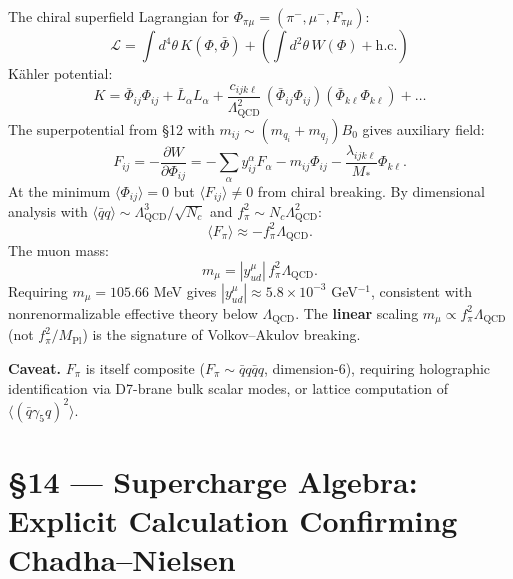 \documentclass[11pt,a4paper]{article}
\newcommand{\Lqcd}{\Lambda_{\text{QCD}}}
\newcommand{\fpi}{f_\pi}
\newcommand{\mmu}{m_\mu}
\newcommand{\qqbar}{\langle\bar{q}q\rangle}
\newcommand{\Nc}{N_c}
\begin{document}
The chiral superfield Lagrangian for $\Phi_{\pi\mu} = (\pi^-, \mu^-, F_{\pi\mu})$:
\begin{equation}
\mathcal{L} = \int d^4\theta\, K(\Phi, \bar{\Phi}) + \left(\int d^2\theta\, W(\Phi) + \text{h.c.}\right)
\end{equation}
K\"ahler potential:
\begin{equation}
K = \bar{\Phi}_{ij}\Phi_{ij} + \bar{L}_\alpha L_\alpha + \frac{c_{ijk\ell}}{\Lqcd^2}\,(\bar{\Phi}_{ij}\Phi_{ij})(\bar{\Phi}_{k\ell}\Phi_{k\ell}) + \ldots
\end{equation}
The superpotential from \S 12 with $m_{ij} \sim (m_{q_i}+m_{q_j})B_0$ gives auxiliary field:
\begin{equation}
F_{ij} = -\frac{\partial W}{\partial \Phi_{ij}} = -\sum_\alpha y^\alpha_{ij} F_\alpha - m_{ij}\Phi_{ij} - \frac{\lambda_{ijk\ell}}{M_*}\Phi_{k\ell}.
\end{equation}
At the minimum $\langle \Phi_{ij} \rangle = 0$ but $\langle F_{ij} \rangle \neq 0$ from chiral breaking.  By dimensional analysis with $\qqbar \sim \Lqcd^3/\sqrt{\Nc}$ and $\fpi^2 \sim \Nc\Lqcd^2$:
\begin{equation}
\langle F_{\pi} \rangle \approx -\fpi^2 \Lqcd.
\end{equation}
The muon mass:
\begin{equation}
\mmu = |y^\mu_{ud}|\,\fpi^2\Lqcd.
\end{equation}
Requiring $\mmu = 105.66$ MeV gives $|y^\mu_{ud}| \approx 5.8 \times 10^{-3}$ GeV$^{-1}$, consistent with nonrenormalizable effective theory below $\Lqcd$.  The \textbf{linear} scaling $\mmu \propto \fpi^2\Lqcd$ (not $\fpi^2/M_{\text{Pl}}$) is the signature of Volkov--Akulov breaking.

\textbf{Caveat.}  $F_\pi$ is itself composite ($F_\pi \sim \bar{q}q\bar{q}q$, dimension-6), requiring holographic identification via D7-brane bulk scalar modes, or lattice computation of $\langle (\bar{q}\gamma_5 q)^2 \rangle$.

\section*{\S 14 --- Supercharge Algebra: Explicit Calculation Confirming Chadha--Nielsen}
\end{document}
